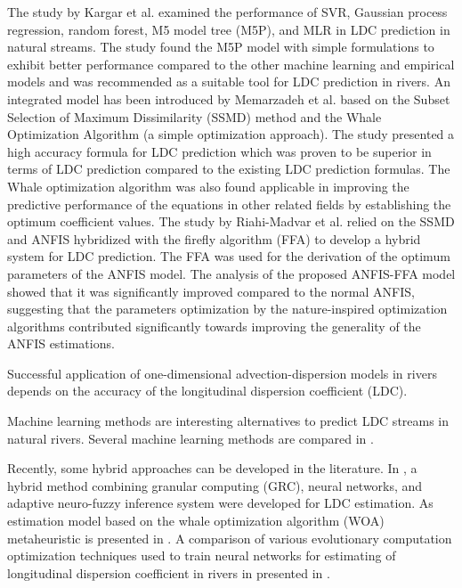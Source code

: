 \documentclass[a4paper,12pt, english]{article}
\begin{document}
The study by Kargar et al. \cite{kargar2020estimating} examined the performance of SVR, Gaussian process regression, random forest, M5 model tree (M5P), and MLR in LDC prediction in natural streams. The study found the M5P model with simple formulations to exhibit better performance compared to the other machine learning and empirical models and was recommended as a suitable tool for LDC prediction in rivers. An integrated model has been introduced by Memarzadeh et al. \cite{memarzadeh2020novel} based on the Subset Selection of Maximum Dissimilarity (SSMD) method and the Whale Optimization Algorithm (a simple optimization approach). The study presented a high accuracy formula for LDC prediction which was proven to be superior in terms of LDC prediction compared to the existing LDC prediction formulas. The Whale optimization algorithm was also found applicable in improving the predictive performance of the equations in other related fields by establishing the optimum coefficient values. The study by Riahi-Madvar et al.\cite{riahi2020improvements} relied on the SSMD and ANFIS hybridized with the firefly algorithm (FFA) to develop a hybrid system for LDC prediction. The FFA was used for the derivation of the optimum parameters of the ANFIS model. The analysis of the proposed ANFIS-FFA model showed that it was significantly improved compared to the normal ANFIS, suggesting that the parameters optimization by the nature-inspired optimization algorithms contributed significantly towards improving the generality of the ANFIS estimations.


Successful application of one-dimensional advection-dispersion models in rivers depends on the accuracy of the longitudinal dispersion coefficient (LDC)\cite{ghiasi:2020}.

Machine learning methods are interesting alternatives to predict LDC streams in natural rivers.
Several machine learning methods are compared in \cite{katayoun:2020}.

Recently, some hybrid approaches can be developed in the literature.
In  \cite{ghiasi:2020}, a hybrid method combining granular computing (GRC), neural networks, and adaptive neuro-fuzzy inference system were developed for  LDC estimation.
As estimation model based on the whale optimization algorithm (WOA) metaheuristic is presented in  \cite{memarzadeh:2020}.
A comparison of various evolutionary computation optimization techniques used to train neural networks for estimating of longitudinal dispersion coefficient in rivers in presented in \cite{piotrowski:2012}.
\end{document}
